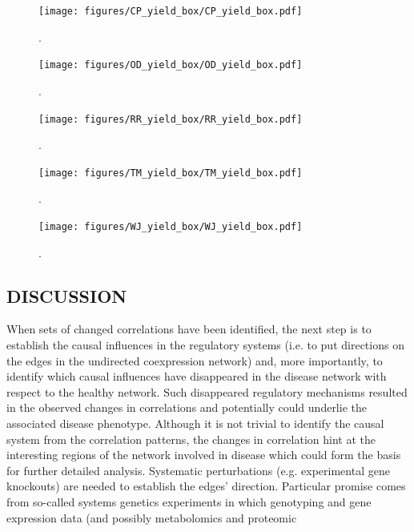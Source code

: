 \begin{figure}[h]
    \centering
        \texttt{[image: figures/CP\_yield\_box/CP\_yield\_box.pdf]}
        \caption{.}
        \label{fig:yield.box_CP}
\end{figure}


\begin{figure}
        \texttt{[image: figures/OD\_yield\_box/OD\_yield\_box.pdf]}
        \caption{.}
\label{fig:yield.box_OD}
\end{figure}

\begin{figure}
    \centering
        \texttt{[image: figures/RR\_yield\_box/RR\_yield\_box.pdf]}
        \caption{.}
        \label{fig:yield.box_RR}
\end{figure}


\begin{figure}
        \texttt{[image: figures/TM\_yield\_box/TM\_yield\_box.pdf]}
        \caption{.}
\label{fig:yield.box_TM}
\end{figure}

\begin{figure}
        \texttt{[image: figures/WJ\_yield\_box/WJ\_yield\_box.pdf]}
        \caption{.}
\label{fig:yield.box_WJ}
\end{figure}


\clearpage
\subsection{DISCUSSION}
When sets of changed correlations have been identified, the next step is to establish the causal influences in the regulatory systems (i.e. to put directions on the edges in the undirected coexpression network) and, more importantly, to identify which causal influences have disappeared in the disease network with respect to the healthy network. Such disappeared regulatory mechanisms resulted in the observed changes in correlations and potentially could underlie the associated disease phenotype. Although it is not trivial to identify the causal system from the correlation patterns, the changes in correlation hint at the interesting regions of the network involved in disease which could form the basis for further detailed analysis. Systematic perturbations (e.g. experimental gene knockouts) are needed to establish the edges’ direction. Particular promise comes from so-called systems genetics experiments in which genotyping and gene expression data (and possibly metabolomics and proteomic

